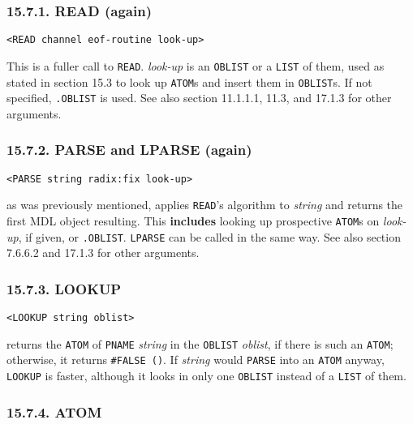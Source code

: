 \documentclass[a4paper,]{article}
\begin{document}
\subsubsection{15.7.1. READ (again)}\label{read-again}

\begin{verbatim}
<READ channel eof-routine look-up>
\end{verbatim}

 This is a fuller call to \texttt{READ}. \emph{look-up} is an \texttt{OBLIST} or a
\texttt{LIST} of them, used as stated in section 15.3 to look up \texttt{ATOM}s and insert them in \texttt{OBLIST}s. If not
specified, \texttt{.OBLIST} is used. See also section 11.1.1.1, 11.3, and 17.1.3 for other arguments.

\subsubsection{15.7.2. PARSE and LPARSE (again)}\label{parse-and-lparse-again}

\begin{verbatim}
<PARSE string radix:fix look-up>
\end{verbatim}

 as was previously mentioned, applies \texttt{READ}'s algorithm to \emph{string} and returns
the first MDL object resulting. This \textbf{includes} looking up prospective \texttt{ATOM}s on \emph{look-up}, if given,
or \texttt{.OBLIST}. \texttt{LPARSE} can be called in the same way. See also section 7.6.6.2
and 17.1.3 for other arguments.

\subsubsection{15.7.3. LOOKUP}\label{lookup}

\begin{verbatim}
<LOOKUP string oblist>
\end{verbatim}

 returns the \texttt{ATOM} of \texttt{PNAME} \emph{string} in the \texttt{OBLIST}
\emph{oblist}, if there is such an \texttt{ATOM}; otherwise, it returns \texttt{\#FALSE\ ()}. If \emph{string} would
\texttt{PARSE} into an \texttt{ATOM} anyway, \texttt{LOOKUP} is faster, although it looks in only one
\texttt{OBLIST} instead of a \texttt{LIST} of them.

\subsubsection{15.7.4. ATOM}\label{atom}
\end{document}
